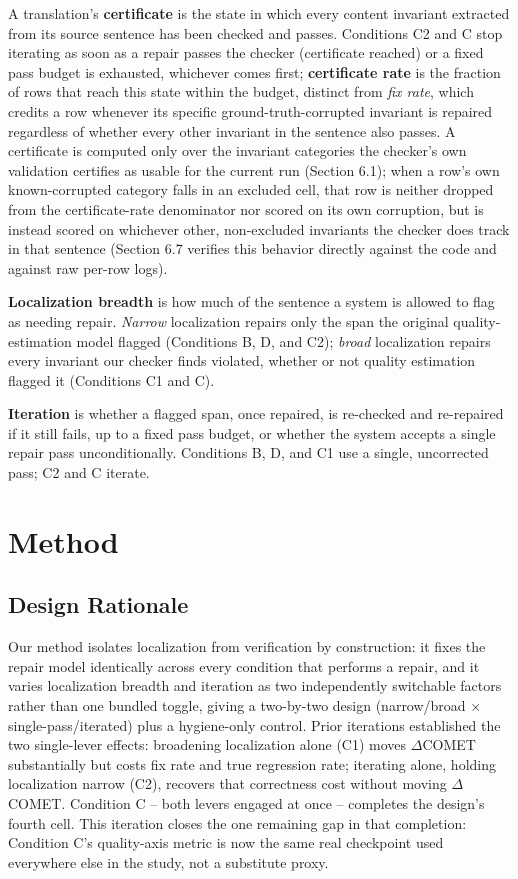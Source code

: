 \documentclass[11pt,letterpaper]{article}
\begin{document}
A translation's \textbf{certificate} is the state in which every content invariant extracted from its source sentence has been checked and passes. Conditions C2 and C stop iterating as soon as a repair passes the checker (certificate reached) or a fixed pass budget is exhausted, whichever comes first; \textbf{certificate rate} is the fraction of rows that reach this state within the budget, distinct from \emph{fix rate}, which credits a row whenever its specific ground-truth-corrupted invariant is repaired regardless of whether every other invariant in the sentence also passes. A certificate is computed only over the invariant categories the checker's own validation certifies as usable for the current run (Section 6.1); when a row's own known-corrupted category falls in an excluded cell, that row is neither dropped from the certificate-rate denominator nor scored on its own corruption, but is instead scored on whichever other, non-excluded invariants the checker does track in that sentence (Section 6.7 verifies this behavior directly against the code and against raw per-row logs).

\textbf{Localization breadth} is how much of the sentence a system is allowed to flag as needing repair. \emph{Narrow} localization repairs only the span the original quality-estimation model flagged (Conditions B, D, and C2); \emph{broad} localization repairs every invariant our checker finds violated, whether or not quality estimation flagged it (Conditions C1 and C).

\textbf{Iteration} is whether a flagged span, once repaired, is re-checked and re-repaired if it still fails, up to a fixed pass budget, or whether the system accepts a single repair pass unconditionally. Conditions B, D, and C1 use a single, uncorrected pass; C2 and C iterate.

\section{Method}

\subsection{Design Rationale}

Our method isolates localization from verification by construction: it fixes the repair model identically across every condition that performs a repair, and it varies localization breadth and iteration as two independently switchable factors rather than one bundled toggle, giving a two-by-two design (narrow/broad $\times$ single-pass/iterated) plus a hygiene-only control. Prior iterations established the two single-lever effects: broadening localization alone (C1) moves $\Delta$COMET substantially but costs fix rate and true regression rate; iterating alone, holding localization narrow (C2), recovers that correctness cost without moving $\Delta$COMET. Condition C -- both levers engaged at once -- completes the design's fourth cell. This iteration closes the one remaining gap in that completion: Condition C's quality-axis metric is now the same real checkpoint used everywhere else in the study, not a substitute proxy.
\end{document}

